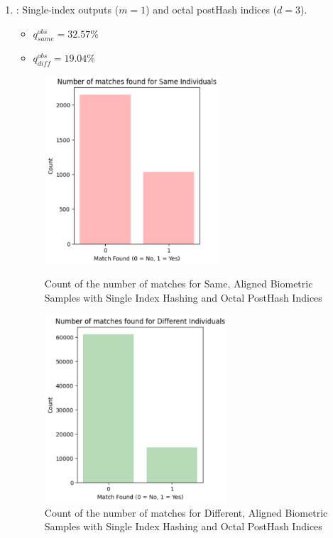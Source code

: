 \begin{enumerate}
    \item {}: Single-index outputs (\(m=1\)) and octal postHash indices (\(d=3\)).
    \begin{itemize}
        \item \(q_{same}^{obs} = 32.57\%\)
        \item \(q_{diff}^{obs} = 19.04\%\)
    \end{itemize}

    \begin{figure}[H]
        \centering
        \begin{minipage}[b]{0.48\linewidth}
            \centering
            \includegraphics[width=\linewidth,height=7cm,keepaspectratio]{latex-img/d3same.png}
            \caption{Count of the number of matches for Same, Aligned Biometric Samples with Single Index Hashing and Octal PostHash Indices}
            \label{mu_same}
        \end{minipage}
        \hfill
        \begin{minipage}[b]{0.48\linewidth}
            \centering
            \includegraphics[width=\linewidth,height=7cm,keepaspectratio]{latex-img/d3diff.png}
            \caption{Count of the number of matches for Different, Aligned Biometric Samples with Single Index Hashing and Octal PostHash Indices}
            \label{mu_diff}
        \end{minipage}
    \end{figure}
    

\end{enumerate}
